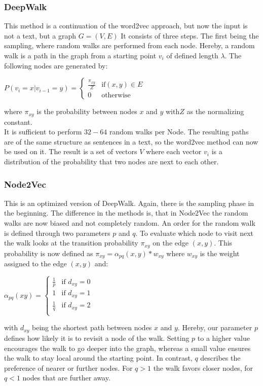 \documentclass[sigconf]{acmart}
\begin{document}
\subsubsection{DeepWalk}
This method is a continuation of the word2vec approach, but now the input is not a text, but a graph \(G = (V,E)\)
It consists of three steps. The first being the sampling, where random walks are performed from each node.
Hereby, a random walk is a path in the graph from a starting point \(v_i\) of defined length \(\lambda\). 
The following nodes are generated by: 
\begin{center}
  \(P(v_i = x|v_{i-1} = y) = \begin{cases} \frac{\pi_{xy}}{Z} &\text{if} (x,y) \in E \\ 0 & \text{otherwise} \end{cases}\)
\end{center} 
where \(\pi_{xy}\) is the probability between nodes \(x\) and \(y\) with\(Z\) as the normalizing constant.\\
It is sufficient to perform \(32-64\) random walks per Node. The resulting paths are of the same structure as sentences in a text, so 
the word2vec method can now be used on it.
The result is a set of vectors \(V\) where each vector \(v_i\) is a distribution of the probability that two nodes are next to each other.


\subsubsection{Node2Vec}
This is an optimized version of DeepWalk.
Again, there is the sampling phase in the beginning. The difference in the methods is, that in Node2Vec the random walks are now biased and not completely random.
An order for the random walk is defined through two parameters \(p\) and \(q\). To evaluate which node to visit next the walk looks at the transition probability
\(\pi_{xy}\) on the edge \((x,y)\). This probability is now defined as \(\pi_{xy} = \alpha_{pq}(x, y) * w_{xy}\) where \(w_{xy}\) is the weight assigned to the edge \((x,y)\) and:
\begin{center}
 \(\alpha_{pq}(xy) = \begin{cases} \frac{1}{p} & \text{if } d_{xy} = 0 \\ 1 & \text{if } d_{xy} = 1 \\\frac{1}{q} & \text{if } d_{xy} = 2 \\\end{cases}\)
\end{center}
with \(d_{xy}\) being the shortest path between nodes \(x\) and \(y\).
Hereby, our parameter \(p\) defines how likely it is to revisit a node of the walk. Setting \(p\) to a higher value encourages the walk to go deeper into the graph, whereas a small value 
ensures the walk to stay local around the starting point. 
In contrast, \(q\) describes the preference of nearer or further nodes. For \(q > 1\) the walk favors closer nodes, for \(q < 1\) nodes that are further away.\cite{Grover.03.07.2016}
\end{document}
